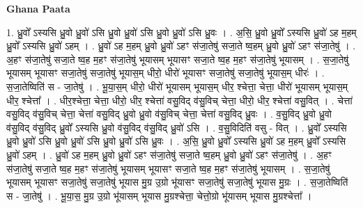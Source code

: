 \documentclass[17pt]{extarticle}
\begin{document}
\textbf{Ghana Paata } \newline

1. ध्रु॒वो᳚ ऽस्यसि ध्रु॒वो ध्रु॒वो॑ ऽसि ध्रु॒वो ध्रु॒वो॑ ऽसि ध्रु॒वो ध्रु॒वो॑ ऽसि ध्रु॒वः । . अ॒सि॒ ध्रु॒वो ध्रु॒वो᳚ ऽस्यसि ध्रु॒वो॑ ऽह म॒हम् ध्रु॒वो᳚ ऽस्यसि ध्रु॒वो॑ ऽहम् । . ध्रु॒वो॑ ऽह म॒हम् ध्रु॒वो ध्रु॒वो॑ ऽहꣳ स॑जा॒तेषु॑ सजा॒ते ष्व॒हम् ध्रु॒वो ध्रु॒वो॑ ऽहꣳ स॑जा॒तेषु॑ । . अ॒हꣳ स॑जा॒तेषु॑ सजा॒ते ष्व॒ह म॒हꣳ स॑जा॒तेषु॑ भूयासम् भूयासꣳ सजा॒ते ष्व॒ह म॒हꣳ स॑जा॒तेषु॑ भूयासम् । . स॒जा॒तेषु॑ भूयासम् भूयासꣳ सजा॒तेषु॑ सजा॒तेषु॑ भूयास॒म् धीरो॒ धीरो॑ भूयासꣳ सजा॒तेषु॑ सजा॒तेषु॑ भूयास॒म् धीरः॑ । . स॒जा॒तेष्विति॑ स - जा॒तेषु॑ । . भू॒या॒स॒म् धीरो॒ धीरो॑ भूयासम् भूयास॒म् धीर॒ श्चेत्ता॒ चेत्ता॒ धीरो॑ भूयासम् भूयास॒म् धीर॒ श्चेत्ता᳚ । . धीर॒श्चेत्ता॒ चेत्ता॒ धीरो॒ धीर॒ श्चेत्ता॑ वसु॒विद् व॑सु॒विच् चेत्ता॒ धीरो॒ धीर॒ श्चेत्ता॑ वसु॒वित् । . चेत्ता॑ वसु॒विद् व॑सु॒विच् चेत्ता॒ चेत्ता॑ वसु॒विद् ध्रु॒वो ध्रु॒वो व॑सु॒विच् चेत्ता॒ चेत्ता॑ वसु॒विद् ध्रु॒वः । . व॒सु॒विद् ध्रु॒वो ध्रु॒वो व॑सु॒विद् व॑सु॒विद् ध्रु॒वो᳚ ऽस्यसि ध्रु॒वो व॑सु॒विद् व॑सु॒विद् ध्रु॒वो॑ ऽसि । . व॒सु॒विदिति॑ वसु - वित् । . ध्रु॒वो᳚ ऽस्यसि ध्रु॒वो ध्रु॒वो॑ ऽसि ध्रु॒वो ध्रु॒वो॑ ऽसि ध्रु॒वो ध्रु॒वो॑ ऽसि ध्रु॒वः । . अ॒सि॒ ध्रु॒वो ध्रु॒वो᳚ ऽस्यसि ध्रु॒वो॑ ऽह म॒हम् ध्रु॒वो᳚ ऽस्यसि ध्रु॒वो॑ ऽहम् । . ध्रु॒वो॑ ऽह म॒हम् ध्रु॒वो ध्रु॒वो॑ ऽहꣳ स॑जा॒तेषु॑ सजा॒ते ष्व॒हम् ध्रु॒वो ध्रु॒वो॑ ऽहꣳ स॑जा॒तेषु॑ । . अ॒हꣳ स॑जा॒तेषु॑ सजा॒ते ष्व॒ह म॒हꣳ स॑जा॒तेषु॑ भूयासम् भूयासꣳ सजा॒ते ष्व॒ह म॒हꣳ स॑जा॒तेषु॑ भूयासम् । . स॒जा॒तेषु॑ भूयासम् भूयासꣳ सजा॒तेषु॑ सजा॒तेषु॑ भूयास मु॒ग्र उ॒ग्रो भू॑यासꣳ सजा॒तेषु॑ सजा॒तेषु॑ भूयास मु॒ग्रः । . स॒जा॒तेष्विति॑ स - जा॒तेषु॑ । . भू॒या॒स॒ मु॒ग्र उ॒ग्रो भू॑यासम् भूयास मु॒ग्रश्चेत्ता॒ चेत्तो॒ग्रो भू॑यासम् भूयास मु॒ग्रश्चेत्ता᳚ । \newline
\end{document}
